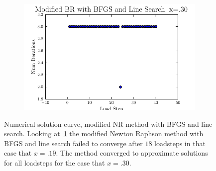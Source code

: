 \documentclass[10pt,letterpaper]{article}
\begin{document}
\begin{figure}[!tbh]
\begin{subfigure}[b]{.6\textwidth}
    \caption{}
    \label{fig6:label:c}
  \end{subfigure}
  \hfill
  \begin{subfigure}[b]{.6\textwidth}
    \includegraphics[width=\textwidth]{moded_nr_bfgs_wls_x30_conv.pdf}
    \caption{}
    \label{fig6:label:d}
  \end{subfigure}
    \caption{Numerical solution curve, modified NR method with BFGS and line search. Looking at~\ref{fig6:label:c} the modified Newton Raphson method with BFGS and line search failed to converge after $18$ loadsteps in that case that $x=.19$. The method converged to approximate solutions for all loadsteps for the case that $x=.30$.
 }
\end{figure}
\end{document}
